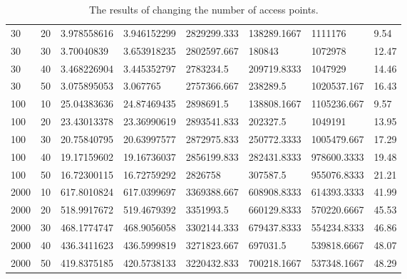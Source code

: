 \begin{landscape}
\begin{table}
\begin{tabularx}{\linewidth}{|X|X|X|X|X|X|X|X|}
                    30 & 20 & 3.978558616 & 3.946152299 & 2829299.333 & 138289.1667 & 1111176 & 9.54 \\
                    30 & 30 & 3.70040839 & 3.653918235 & 2802597.667 & 180843 & 1072978 & 12.47 \\
                    30 & 40 & 3.468226904 & 3.445352797 & 2783234.5 & 209719.8333 & 1047929 & 14.46 \\
                    30 & 50 & 3.075895053 & 3.067765 & 2757366.667 & 238289.5 & 1020537.167 & 16.43 \\
                    100 & 10 & 25.04383636 & 24.87469435 & 2898691.5 & 138808.1667 & 1105236.667 & 9.57 \\
                    100 & 20 & 23.43013378 & 23.36990619 & 2893541.833 & 202327.5 & 1049191 & 13.95 \\
                    100 & 30 & 20.75840795 & 20.63997577 & 2872975.833 & 250772.3333 & 1005479.667 & 17.29 \\
                    100 & 40 & 19.17159602 & 19.16736037 & 2856199.833 & 282431.8333 & 978600.3333 & 19.48 \\
                    100 & 50 & 16.72300115 & 16.72759292 & 2826758 & 307587.5 & 955076.8333 & 21.21 \\
                    2000 & 10 & 617.8010824 & 617.0399697 & 3369388.667 & 608908.8333 & 614393.3333 & 41.99 \\
                    2000 & 20 & 518.9917672 & 519.4679392 & 3351993.5 & 660129.8333 & 570220.6667 & 45.53 \\
                    2000 & 30 & 468.1774747 & 468.9056058 & 3302144.333 & 679437.8333 & 554234.8333 & 46.86 \\
                    2000 & 40 & 436.3411623 & 436.5999819 & 3271823.667 & 697031.5 & 539818.6667 & 48.07 \\
                    2000 & 50 & 419.8375185 & 420.5738133 & 3220432.833 & 700218.1667 & 537348.1667 & 48.29 \\
                    \hline
                \end{tabularx}
                \caption{The results of changing the number of access points.}
                \label{tab:num_aps}
            \end{table}
        \end{landscape}


